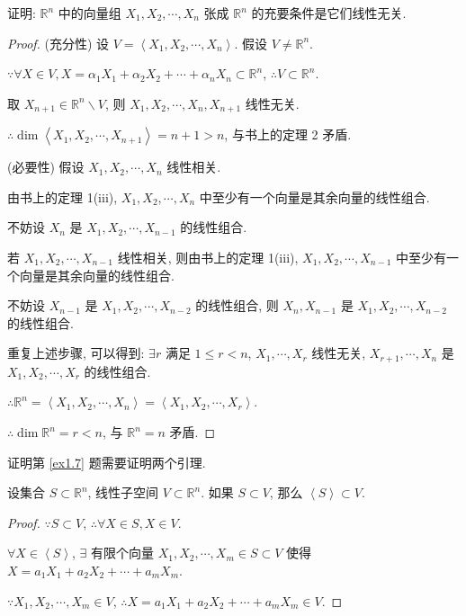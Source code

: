 \documentclass[color=black,device=normal,lang=cn,mode=geye]{elegantnote}
\begin{document}
\addtocounter{exercise}{2}
\begin{exercise}%
    证明: $\mathbb{R}^n$ 中的向量组 $X_1,X_2,\cdots,X_n$ 张成 $\mathbb{R}^n$ 的充要条件是它们线性无关.
\end{exercise}
\begin{proof}
    (充分性) 设 $V=\left<X_1,X_2,\cdots,X_n\right>$. 假设 $V\neq\mathbb{R}^n$.

    $\because\forall X\in V,X=\alpha_1X_1+\alpha_2X_2+\cdots+\alpha_nX_n\subset\mathbb{R}^n$, $\therefore V\subset\mathbb{R}^n$.

    取 $X_{n+1}\in\mathbb{R}^n\backslash V$, 则 $X_1,X_2,\cdots,X_n,X_{n+1}$ 线性无关.

    $\therefore\dim\left<X_1,X_2,\cdots,X_{n+1}\right>=n+1>n$, 与书上的定理 2 矛盾.

    (必要性) 假设 $X_1,X_2,\cdots,X_n$ 线性相关.

    由书上的定理 1(iii), $X_1,X_2,\cdots,X_n$ 中至少有一个向量是其余向量的线性组合.
    
    不妨设 $X_n$ 是 $X_1,X_2,\cdots,X_{n-1}$ 的线性组合.

    若 $X_1,X_2,\cdots,X_{n-1}$ 线性相关, 则由书上的定理 1(iii), $X_1,X_2,\cdots,X_{n-1}$ 中至少有一个向量是其余向量的线性组合.

    不妨设 $X_{n-1}$ 是 $X_1,X_2,\cdots,X_{n-2}$ 的线性组合, 则 $X_n,X_{n-1}$ 是 $X_1,X_2,\cdots,X_{n-2}$ 的线性组合.

    重复上述步骤, 可以得到: $\exists r$ 满足 $1\leq r<n$, $X_1,\cdots,X_r$ 线性无关, $X_{r+1},\cdots,X_n$ 是 $X_1,X_2,\cdots,X_r$ 的线性组合.

    $\therefore\mathbb{R}^n=\left<X_1,X_2,\cdots,X_n\right>=\left<X_1,X_2,\cdots,X_r\right>$.

    $\therefore\dim\mathbb{R}^n=r<n$, 与 $\mathbb{R}^n=n$ 矛盾.
\end{proof}
证明第 \ref{ex1.7} 题需要证明两个引理.
\begin{lemma}\label{l2.1}
    设集合 $S\subset\mathbb{R}^n$, 线性子空间 $V\subset\mathbb{R}^n$. 如果 $S\subset V$, 那么 $\left<S\right>\subset V$.
\end{lemma}
\begin{proof}
    $\because S\subset V$, $\therefore\forall X\in S,X\in V$.

    $\forall X\in\left<S\right>$, $\exists$ 有限个向量 $X_1,X_2,\cdots,X_m\in S\subset V$ 使得 $X=a_1X_1+a_2X_2+\cdots+a_mX_m$.

    $\because X_1,X_2,\cdots,X_m\in V$, $\therefore X=a_1X_1+a_2X_2+\cdots+a_mX_m\in V$.
\end{proof}
\end{document}
